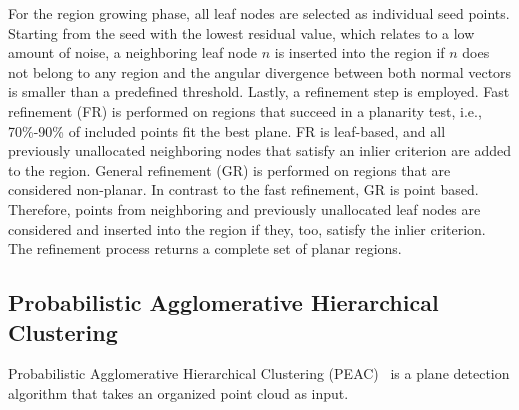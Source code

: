 \documentclass[main.tex]{subfiles}
\begin{document}
For the region growing phase, all leaf nodes are selected as individual seed points. Starting from the seed with the lowest residual value, which relates to a low amount of noise,
a neighboring leaf node $n$ is inserted into the region if $n$ does not belong to any region and the angular divergence between both normal vectors is smaller than
a predefined threshold.
Lastly, a refinement step is employed.
Fast refinement (FR) is performed on regions that succeed in a planarity test, i.e., 70\%-90\% of included points fit the best plane. FR is leaf-based, and all previously unallocated neighboring nodes that satisfy an inlier criterion are added to the region.
General refinement (GR) is performed on regions that are considered non-planar. In contrast to the fast refinement, GR is point based. Therefore,
points from neighboring and previously unallocated leaf nodes are considered and inserted into the region if they, too, satisfy the inlier criterion.
The refinement process returns a complete set of planar regions.

\subsection{Probabilistic Agglomerative Hierarchical Clustering}
Probabilistic Agglomerative Hierarchical Clustering (PEAC)~\cite{Feng_Taguchi_Kamat_2014} is a plane detection algorithm that takes an organized
point cloud as input.
\end{document}
